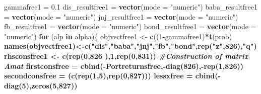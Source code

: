 \documentclass[]{article}
\newenvironment{Shaded}{\begin{snugshade}}{\end{snugshade}}
\newcommand{\KeywordTok}[1]{\textcolor[rgb]{0.13,0.29,0.53}{\textbf{#1}}}
\newcommand{\DataTypeTok}[1]{\textcolor[rgb]{0.13,0.29,0.53}{#1}}
\newcommand{\DecValTok}[1]{\textcolor[rgb]{0.00,0.00,0.81}{#1}}
\newcommand{\FloatTok}[1]{\textcolor[rgb]{0.00,0.00,0.81}{#1}}
\newcommand{\StringTok}[1]{\textcolor[rgb]{0.31,0.60,0.02}{#1}}
\newcommand{\CommentTok}[1]{\textcolor[rgb]{0.56,0.35,0.01}{\textit{#1}}}
\newcommand{\ControlFlowTok}[1]{\textcolor[rgb]{0.13,0.29,0.53}{\textbf{#1}}}
\newcommand{\OperatorTok}[1]{\textcolor[rgb]{0.81,0.36,0.00}{\textbf{#1}}}
\newcommand{\NormalTok}[1]{#1}
\begin{document}
\begin{Shaded}
\begin{Highlighting}[]
\NormalTok{gammafree1 =}\StringTok{ }\FloatTok{0.1}
\NormalTok{dis_resultfree1 =}\StringTok{ }\KeywordTok{vector}\NormalTok{(}\DataTypeTok{mode =} \StringTok{"numeric"}\NormalTok{)}
\NormalTok{baba_resultfree1 =}\StringTok{ }\KeywordTok{vector}\NormalTok{(}\DataTypeTok{mode =} \StringTok{"numeric"}\NormalTok{)}
\NormalTok{jnj_resultfree1 =}\StringTok{ }\KeywordTok{vector}\NormalTok{(}\DataTypeTok{mode =} \StringTok{"numeric"}\NormalTok{)}
\NormalTok{fb_resultfree1 =}\StringTok{ }\KeywordTok{vector}\NormalTok{(}\DataTypeTok{mode =} \StringTok{"numeric"}\NormalTok{)}
\NormalTok{bond_resultfree1 =}\StringTok{ }\KeywordTok{vector}\NormalTok{(}\DataTypeTok{mode =} \StringTok{"numeric"}\NormalTok{)}
\ControlFlowTok{for}\NormalTok{ (alp }\ControlFlowTok{in}\NormalTok{ alpha)\{}
\NormalTok{  objvectfree1 <-}\StringTok{ }\KeywordTok{c}\NormalTok{((}\DecValTok{1}\OperatorTok{-}\NormalTok{gammafree1)}\OperatorTok{*}\KeywordTok{t}\NormalTok{(prob)}\OperatorTok{%
  \KeywordTok{names}\NormalTok{(objvectfree1)<-}\KeywordTok{c}\NormalTok{(}\StringTok{"dis"}\NormalTok{,}\StringTok{"baba"}\NormalTok{,}\StringTok{"jnj"}\NormalTok{,}\StringTok{"fb"}\NormalTok{,}\StringTok{"bond"}\NormalTok{,}\KeywordTok{rep}\NormalTok{(}\StringTok{"z"}\NormalTok{,}\DecValTok{826}\NormalTok{),}\StringTok{"q"}\NormalTok{) }
\NormalTok{  rhsconsfree1 <-}\StringTok{ }\KeywordTok{c}\NormalTok{(}\KeywordTok{rep}\NormalTok{(}\DecValTok{0}\NormalTok{,}\DecValTok{826}\NormalTok{ ),}\DecValTok{1}\NormalTok{,}\KeywordTok{rep}\NormalTok{(}\DecValTok{0}\NormalTok{,}\DecValTok{831}\NormalTok{))}
\CommentTok{#Construction of matrix Amat}
\NormalTok{  firstconsfree =}\StringTok{ }\KeywordTok{cbind}\NormalTok{(}\OperatorTok{-}\NormalTok{Portreturnsfree,}\OperatorTok{-}\KeywordTok{diag}\NormalTok{(}\DecValTok{826}\NormalTok{),}\OperatorTok{-}\KeywordTok{rep}\NormalTok{(}\DecValTok{1}\NormalTok{,}\DecValTok{826}\NormalTok{))}
\NormalTok{  secondconsfree =}\StringTok{ }\NormalTok{(}\KeywordTok{c}\NormalTok{(}\KeywordTok{rep}\NormalTok{(}\DecValTok{1}\NormalTok{,}\DecValTok{5}\NormalTok{),}\KeywordTok{rep}\NormalTok{(}\DecValTok{0}\NormalTok{,}\DecValTok{827}\NormalTok{)))}
\NormalTok{  lessxfree =}\StringTok{ }\KeywordTok{cbind}\NormalTok{(}\OperatorTok{-}\KeywordTok{diag}\NormalTok{(}\DecValTok{5}\NormalTok{),}\KeywordTok{zeros}\NormalTok{(}\DecValTok{5}\NormalTok{,}\DecValTok{827}\NormalTok{))}
}
\end{Highlighting}
\end{Shaded}
\end{document}
